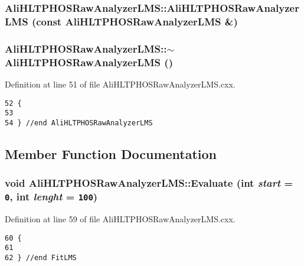 \subsubsection{\setlength{\rightskip}{0pt plus 5cm}Ali\-HLTPHOSRaw\-Analyzer\-LMS::Ali\-HLTPHOSRaw\-Analyzer\-LMS (const {\bf Ali\-HLTPHOSRaw\-Analyzer\-LMS} \&)}\label{classAliHLTPHOSRawAnalyzerLMS_a2}


\subsubsection{\setlength{\rightskip}{0pt plus 5cm}Ali\-HLTPHOSRaw\-Analyzer\-LMS::$\sim${\bf Ali\-HLTPHOSRaw\-Analyzer\-LMS} ()\hspace{0.3cm}{\tt  [virtual]}}\label{classAliHLTPHOSRawAnalyzerLMS_a4}




Definition at line 51 of file Ali\-HLTPHOSRaw\-Analyzer\-LMS.cxx.

\footnotesize\begin{verbatim}52 {
53 
54 } //end AliHLTPHOSRawAnalyzerLMS
\end{verbatim}\normalsize 




\subsection{Member Function Documentation}
\subsubsection{\setlength{\rightskip}{0pt plus 5cm}void Ali\-HLTPHOSRaw\-Analyzer\-LMS::Evaluate (int {\em start} = {\tt 0}, int {\em lenght} = {\tt 100})\hspace{0.3cm}{\tt  [virtual]}}\label{classAliHLTPHOSRawAnalyzerLMS_a5}




Definition at line 59 of file Ali\-HLTPHOSRaw\-Analyzer\-LMS.cxx.

\footnotesize\begin{verbatim}60 {
61 
62 } //end FitLMS
\end{verbatim}\normalsize 


